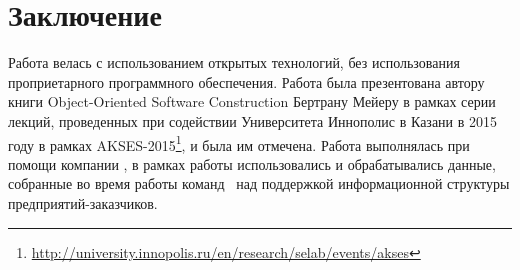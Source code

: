 \chapter*{Заключение}						%




Работа велась с использованием открытых технологий, без использования проприетарного программного обеспечения. Работа была презентована автору книги Object-Oriented Software Construction \cite{Meyer} Бертрану Мейеру в рамках серии лекций, проведенных при содействии Университета Иннополис в Казани в 2015 году в рамках AKSES-2015\footnote{\url{http://university.innopolis.ru/en/research/selab/events/akses}}, и была им отмечена.  
Работа выполнялась при помощи компании \icl, в рамках работы использовались и обрабатывались данные, собранные во время работы команд \icl\  над поддержкой информационной структуры предприятий-заказчиков.